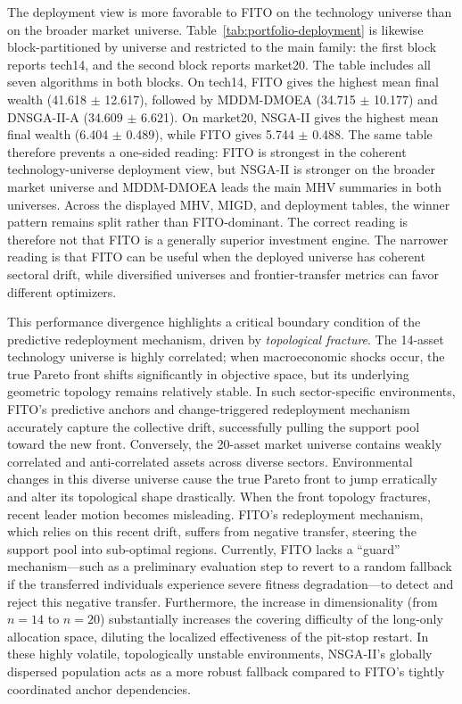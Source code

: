 \documentclass[preprint,12pt]{elsarticle}
\begin{document}
The deployment view is more favorable to FITO on the technology universe than on the broader market universe. Table~\ref{tab:portfolio-deployment} is likewise block-partitioned by universe and restricted to the main family: the first block reports tech14, and the second block reports market20. The table includes all seven algorithms in both blocks. On tech14, FITO gives the highest mean final wealth (41.618 $\pm$ 12.617), followed by MDDM-DMOEA (34.715 $\pm$ 10.177) and DNSGA-II-A (34.609 $\pm$ 6.621). On market20, NSGA-II gives the highest mean final wealth (6.404 $\pm$ 0.489), while FITO gives 5.744 $\pm$ 0.488. The same table therefore prevents a one-sided reading: FITO is strongest in the coherent technology-universe deployment view, but NSGA-II is stronger on the broader market universe and MDDM-DMOEA leads the main MHV summaries in both universes. Across the displayed MHV, MIGD, and deployment tables, the winner pattern remains split rather than FITO-dominant. The correct reading is therefore not that FITO is a generally superior investment engine. The narrower reading is that FITO can be useful when the deployed universe has coherent sectoral drift, while diversified universes and frontier-transfer metrics can favor different optimizers.

This performance divergence highlights a critical boundary condition of the predictive redeployment mechanism, driven by \textit{topological fracture}. The 14-asset technology universe is highly correlated; when macroeconomic shocks occur, the true Pareto front shifts significantly in objective space, but its underlying geometric topology remains relatively stable. In such sector-specific environments, FITO's predictive anchors and change-triggered redeployment mechanism accurately capture the collective drift, successfully pulling the support pool toward the new front. Conversely, the 20-asset market universe contains weakly correlated and anti-correlated assets across diverse sectors. Environmental changes in this diverse universe cause the true Pareto front to jump erratically and alter its topological shape drastically. When the front topology fractures, recent leader motion becomes misleading. FITO's redeployment mechanism, which relies on this recent drift, suffers from negative transfer, steering the support pool into sub-optimal regions. Currently, FITO lacks a ``guard'' mechanism---such as a preliminary evaluation step to revert to a random fallback if the transferred individuals experience severe fitness degradation---to detect and reject this negative transfer. Furthermore, the increase in dimensionality (from $n=14$ to $n=20$) substantially increases the covering difficulty of the long-only allocation space, diluting the localized effectiveness of the pit-stop restart. In these highly volatile, topologically unstable environments, NSGA-II's globally dispersed population acts as a more robust fallback compared to FITO's tightly coordinated anchor dependencies.
\end{document}
